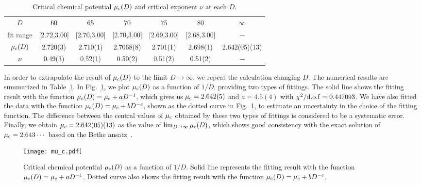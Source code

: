 \documentclass[nofootinbib,prd,aps,superscriptaddress,preprintnumbers,twocolumn,showpacs]{revtex4-1}
\begin{document}
\begin{table*}[htb]
	\label{tab:mu_c}
	\caption{Critical chemical potential $\mu_{\rm c}(D)$ and critical exponent $\nu$ at each $D$.}
	\begin{center}
		\begin{tabular}{|c|cccccc|}\hline
    		$D$ & 60 & 65 & 70 & 75 & 80 & $\infty$ \\ %
    		{\rm fit\; range} & [2.72,3.00] & [2.70,3.00] & [2.70,3.00] & [2.69,3.00] & [2.68,3.00] & $-$ \\ \hline
    		$\mu_{\rm c}(D)$ & 2.720(3) & 2.710(1) & 2.7068(8) & 2.701(1) & 2.698(1) & 2.642(05)(13)\\ %
    		$\nu$ & 0.49(3) & 0.52(1) & 0.50(2) & 0.51(2) & 0.51(2) & $-$\\ \hline
	\end{tabular}
	\end{center}
\end{table*}

In order to extrapolate the result of $\mu_{\rm c}(D)$ to the limit $D\to\infty$, we repeat the calculation changing $D$. The numerical results are summarized in Table~\ref{tab:mu_c}. In Fig.~\ref{fig:mu_c}, we plot $\mu_{\rm c}(D)$ as a function of $1/D$, providing two types of fittings. The solid line shows the fitting result with the function $\mu_{\rm c}(D)=\mu_{\rm c}+aD^{-1}$, which gives us $\mu_{\rm c}=2.642(5)$ and $a=4.5(4)$ with $\chi^2/{\rm d.o.f}=0.447093$. We have also fitted the data with the function $\mu_{\rm c}(D)=\mu_{\rm c}+bD^{-c}$, shown as the dotted curve in Fig.~\ref{fig:mu_c}, to estimate an uncertainty in the choice of the fitting function. The difference between the central values of $\mu_{\rm c}$ obtained by these two types of fittings is considered to be a systematic error. Finally, we obtain $\mu_{\rm c}=2.642(05)(13)$ as the value of $\lim_{D\to\infty}\mu_{\rm c}(D)$, which shows good consistency with the exact solution of $\mu_{\rm c}=2.643\cdots$ based on the Bethe ansatz~\cite{PhysRevLett.20.1445,LIEB20031}.

\begin{figure}[htbp]
	\centering
	\texttt{[image: mu\_c.pdf]}
	\caption{Critical chemical potential $\mu_{\rm c}(D)$ as a function of $1/D$. Solid line represents the fitting result with the function $\mu_{\rm c}(D)=\mu_{\rm c}+aD^{-1}$. Dotted curve also shows the fitting result with the function $\mu_{\rm c}(D)=\mu_{\rm c}+bD^{-c}$.}
 	\label{fig:mu_c}
\end{figure}
\end{document}
